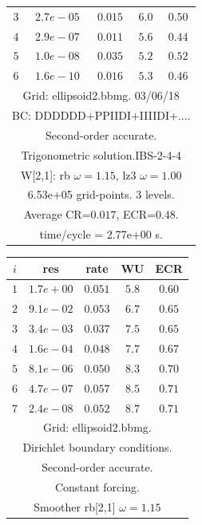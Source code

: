 \begin{table}[hbt]
\begin{center}
{\begin{tabular}{|c|c|c|c|c|}
 $ 3$  & $ 2.7e-05$ & $0.015$ & $ 6.0$ & $0.50$ \\ 
 $ 4$  & $ 2.9e-07$ & $0.011$ & $ 5.6$ & $0.44$ \\ 
 $ 5$  & $ 1.0e-08$ & $0.035$ & $ 5.2$ & $0.52$ \\ 
 $ 6$  & $ 1.6e-10$ & $0.016$ & $ 5.3$ & $0.46$ \\ 
\hline 
\multicolumn{5}{|c|}{Grid: ellipsoid2.bbmg. 03/06/18}  \\
\multicolumn{5}{|c|}{BC: DDDDDD+PPIIDI+IIIIDI+....}  \\
\multicolumn{5}{|c|}{Second-order accurate.}  \\
\multicolumn{5}{|c|}{Trigonometric solution.IBS-2-4-4}  \\
\multicolumn{5}{|c|}{W[2,1]: rb $\omega=1.15$, lz3 $\omega=1.00$}  \\
\multicolumn{5}{|c|}{6.53e+05 grid-points. 3 levels.}  \\
\multicolumn{5}{|c|}{Average CR=$0.017$, ECR=$0.48$.}  \\
\multicolumn{5}{|c|}{time/cycle = 2.77e+00 s.}  \\
\hline 
\end{tabular}
\begin{tabular}{|c|c|c|c|c|} \hline 
 $i$   & res      & rate    &  WU    & ECR  \\   \hline 
 $ 1$  & $ 1.7e+00$ & $0.051$ & $ 5.8$ & $0.60$ \\ 
 $ 2$  & $ 9.1e-02$ & $0.053$ & $ 6.7$ & $0.65$ \\ 
 $ 3$  & $ 3.4e-03$ & $0.037$ & $ 7.5$ & $0.65$ \\ 
 $ 4$  & $ 1.6e-04$ & $0.048$ & $ 7.7$ & $0.67$ \\ 
 $ 5$  & $ 8.1e-06$ & $0.050$ & $ 8.3$ & $0.70$ \\ 
 $ 6$  & $ 4.7e-07$ & $0.057$ & $ 8.5$ & $0.71$ \\ 
 $ 7$  & $ 2.4e-08$ & $0.052$ & $ 8.7$ & $0.71$ \\ 
\hline 
\multicolumn{5}{|c|}{Grid: ellipsoid2.bbmg.}  \\
\multicolumn{5}{|c|}{Dirichlet boundary conditions.}  \\
\multicolumn{5}{|c|}{Second-order accurate.}  \\
\multicolumn{5}{|c|}{Constant forcing.}  \\
\multicolumn{5}{|c|}{Smoother rb[2,1] $\omega=1.15$}  \\

\end{tabular}}
\end{center}
\end{table}
